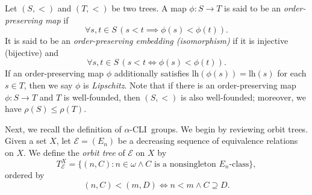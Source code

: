 \documentclass[11pt]{amsart}
\newtheorem{proposition}[theorem]{Proposition}
\theoremstyle{definition}
\theoremstyle{remark}
\numberwithin{equation}{section}
\def\lh{{\mathrm{lh}}}
\def\hier#1{$#1$-CLI}
\def\otr#1#2{T_{\mathcal{#1}}^{#2}}
\begin{document}

Let $(S,<)$ and $(T,<)$ be two trees. A map $\phi:S\to T$ is said to be an {\it order-preserving map} if
$$\forall s,t\in S\,(s<t\implies\phi(s)<\phi(t)).$$
It is said to be an {\it order-preserving embedding (isomorphism)} if it is injective (bijective) and
$$\forall s,t\in S\,(s<t\iff\phi(s)<\phi(t)).$$
If an order-preserving map $\phi$ additionally satisfies $\lh(\phi(s))=\lh(s)$ for each $s\in T$, then we say $\phi$ is {\it Lipschitz}. Note that if there is an order-preserving map $\phi:S\to T$ and $T$ is well-founded, then $(S,<)$ is also well-founded; moreover, we have $\rho(S)\leq\rho(T)$.



Next, we recall the definition of \hier\alpha\ groups. We begin by reviewing orbit trees. Given a set $X$, let $\mathcal{E}=(E_n)$ be a decreasing sequence of equivalence relations on $X$. We define the {\it orbit tree} of $\mathcal{E}$ on $X$ by
$$\otr{E}{X}=\{(n,C):n\in\omega\wedge C\mbox{ is a nonsingleton $E_n$-class}\},$$
ordered by
$$(n,C)<(m,D)\iff n<m\land C\supseteq D.$$
\end{document}
